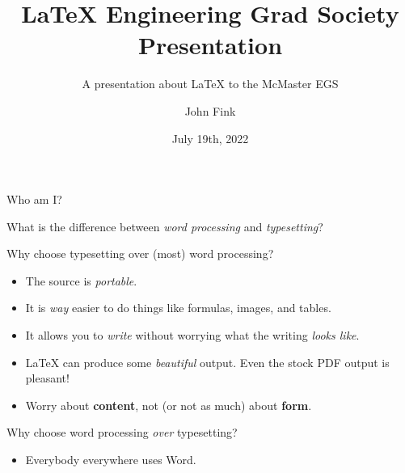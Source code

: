 \documentclass{beamer}
\title{\LaTeX{} Engineering Grad Society Presentation}
\subtitle{A presentation about \LaTeX{} to the McMaster EGS}
\author{John Fink}
\institute{McMaster University}
\date{July 19th, 2022}
\begin{document}
	\begin{frame}
		\titlepage
	\end{frame}

	\begin{frame}
		Who am I?
	\end{frame}

\begin{frame}
	What is the difference between \textit{word processing} and \textit{typesetting}?
\end{frame}

\begin{frame}
	Why choose typesetting over (most) word processing?
	\begin{itemize}
		\item The source is \textit{portable}.
		\pause
		\item It is \textit{way} easier to do things like formulas, images, and tables.
		\pause
		\item It allows you to \textit{write} without worrying what the writing \textit{looks like}.
		\pause
		\item \LaTeX{} can produce some \textit{beautiful} output. Even the stock PDF output is pleasant!
	\end{itemize}
	

\end{frame}



\begin{frame}
	\begin{itemize}
		\item Worry about \textbf{content}, not (or not as much) about \textbf{form}.
	\end{itemize}
\end{frame}


\begin{frame}
	Why choose word processing \textit{over} typesetting?
\end{frame}

\begin{frame}
	\begin{itemize}
		\item Everybody everywhere uses Word.
	\end{itemize}
\end{frame}
\end{document}
